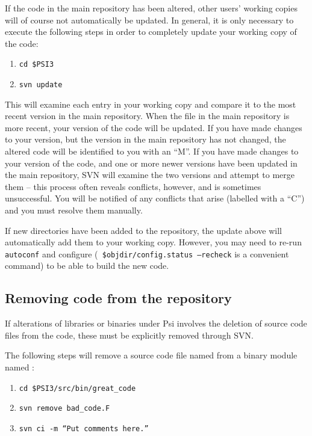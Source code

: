 If the code in the main repository has been altered, other users' working
copies will of course not automatically be updated.  In general, it is
only necessary to execute the following steps in order to completely update
your working copy of the code:

\begin{enumerate}
\item {\tt cd \$PSI3}
\item {\tt svn update}
\end{enumerate}

This will examine each entry in your working copy and compare it to
the most recent version in the main repository. When the file in the
main repository is more recent, your version of the code will be
updated. If you have made changes to your version, but the version in
the main repository has not changed, the altered code will be
identified to you with an ``M''. If you have made changes to your
version of the code, and one or more newer versions have been updated
in the main repository, SVN will examine the two versions and attempt
to merge them -- this process often reveals conflicts, however, and is
sometimes unsuccessful. You will be notified of any conflicts that
arise (labelled with a ``C'') and you must resolve them manually.

If new directories have been added to the repository, the update above
will automatically add them to your working copy.  However, you may
need to re-run {\tt autoconf} and configure ({\tt
  \$objdir/config.status --recheck} is a convenient command) to be
able to build the new code.

\subsection{Removing code from the repository}
If alterations of libraries or binaries under Psi involves the deletion of 
source code files from the code, these must be explicitly removed through SVN.

The following steps will remove a source code file named  
from a binary module named :
\begin{enumerate}
\item {\tt cd \$PSI3/src/bin/great\_code}
\item {\tt svn remove bad\_code.F}
\item {\tt svn ci -m ``Put comments here.''}
\end{enumerate}


